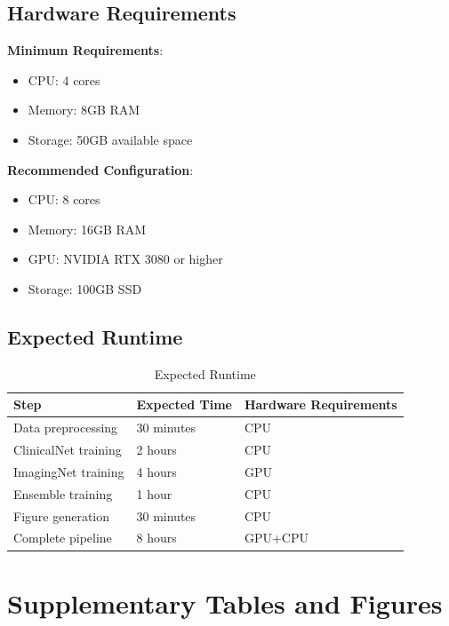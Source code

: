\documentclass[12pt, a4paper]{article}
\begin{document}
\subsection{Hardware Requirements}
\textbf{Minimum Requirements}:
\begin{itemize}
    \item CPU: 4 cores
    \item Memory: 8GB RAM
    \item Storage: 50GB available space
\end{itemize}
\textbf{Recommended Configuration}:
\begin{itemize}
    \item CPU: 8 cores
    \item Memory: 16GB RAM
    \item GPU: NVIDIA RTX 3080 or higher
    \item Storage: 100GB SSD
\end{itemize}

\subsection{Expected Runtime}
\begin{table}[htbp]
\centering
\caption{Expected Runtime}
\label{tab:runtime}
\begin{tabular}{@{}lll@{}}
\toprule
\textbf{Step} & \textbf{Expected Time} & \textbf{Hardware Requirements} \\ \midrule
Data preprocessing & 30 minutes & CPU \\
ClinicalNet training & 2 hours & CPU \\
ImagingNet training & 4 hours & GPU \\
Ensemble training & 1 hour & CPU \\
Figure generation & 30 minutes & CPU \\
Complete pipeline & 8 hours & GPU+CPU \\ \bottomrule
\end{tabular}
\end{table}
\clearpage

\section{Supplementary Tables and Figures}
\end{document}
